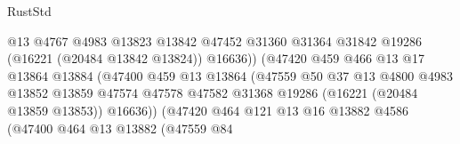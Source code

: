 \begin{lexlean}{RustStd}
\begin{coremodule}
                                            @13
                                            @4767
                                            @4983
                                            @13823
                                            @13842
                                            @47452
                                            @31360
                                            @31364
                                            @31842
                                            @19286
                                            (@16221 (@20484 @13842 @13824))
                                            @16636))
                                        (@47420
                                          @459
                                          @466
                                          @13
                                          @17
                                          @13864
                                          @13884
                                          (@47400
                                            @459
                                            @13
                                            @13864
                                            (@47559
                                              @50
                                              @37
                                              @13
                                              @4800
                                              @4983
                                              @13852
                                              @13859
                                              @47574
                                              @47578
                                              @47582
                                              @31368
                                              @19286
                                              (@16221 (@20484 @13859 @13853))
                                              @16636))
                                          (@47420
                                            @464
                                            @121
                                            @13
                                            @16
                                            @13882
                                            @4586
                                            (@47400
                                              @464
                                              @13
                                              @13882
                                              (@47559
                                                @84

\end{coremodule}
\end{lexlean}
